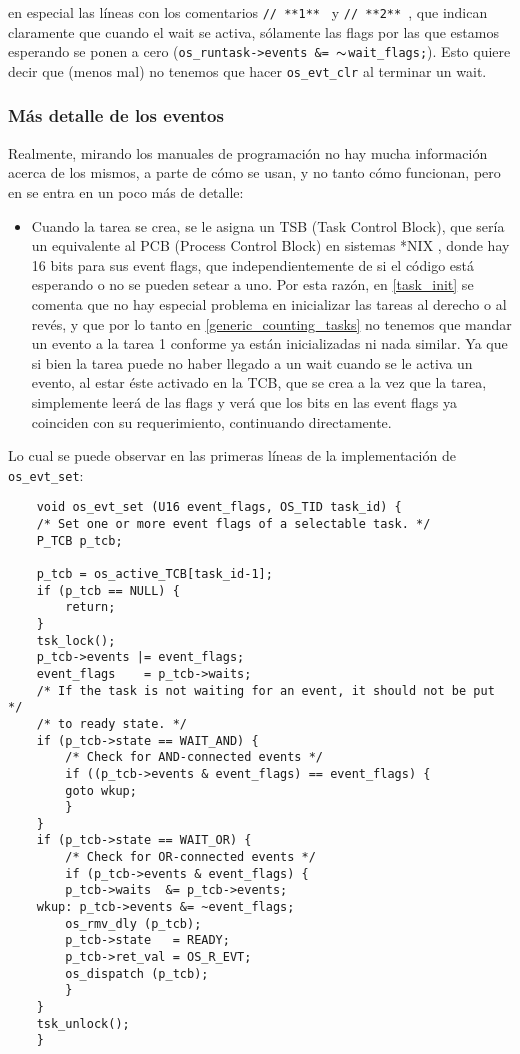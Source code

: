 \documentclass[a4paper,openright,12pt]{article}
\begin{document}
en especial las líneas con los comentarios \texttt{// **1**  } y \texttt{// **2**  }, que indican claramente
que cuando el wait se activa, sólamente las flags por las que estamos esperando se ponen a cero (\texttt{os\_runtask->events \&= $\thicksim$wait\_flags;}).
Esto quiere decir que (menos mal) no tenemos que hacer \texttt{os\_evt\_clr} al terminar un wait.

\subsubsection{Más detalle de los eventos}
Realmente, mirando los manuales de programación no hay mucha información acerca de los mismos, a parte de cómo se usan, y no tanto cómo funcionan, pero en \autocite[28]{rl_arm_gs}
se entra en un poco más de detalle:
\begin{itemize}
    \item Cuando la tarea se crea, se le asigna un TSB (Task Control Block), que sería un equivalente al PCB (Process Control Block) en sistemas *NIX
          \parencite{process_control_block_pcb_wikipedia}, donde hay 16 bits para sus event flags, que independientemente de si el código está esperando o no se pueden setear a uno.
          Por esta razón, en \ref{task_init} se comenta que no hay especial problema en inicializar las tareas al derecho o al revés, y que por lo tanto en \ref{generic_counting_tasks}
          no tenemos que mandar un evento a la tarea 1 conforme ya están inicializadas ni nada similar.
          Ya que si bien la tarea puede no haber llegado a un wait cuando se le activa un evento, al estar éste activado en la TCB, que se
          crea a la vez que la tarea, simplemente leerá de las flags y verá que los bits en las event flags ya coinciden con su requerimiento, continuando directamente.
\end{itemize}
Lo cual se puede observar en las primeras líneas de la implementación de \texttt{os\_evt\_set}:
\begin{verbatim}
    void os_evt_set (U16 event_flags, OS_TID task_id) {
    /* Set one or more event flags of a selectable task. */
    P_TCB p_tcb;

    p_tcb = os_active_TCB[task_id-1];
    if (p_tcb == NULL) {
        return;
    }
    tsk_lock();
    p_tcb->events |= event_flags;
    event_flags    = p_tcb->waits;
    /* If the task is not waiting for an event, it should not be put */
    /* to ready state. */
    if (p_tcb->state == WAIT_AND) {
        /* Check for AND-connected events */
        if ((p_tcb->events & event_flags) == event_flags) {
        goto wkup;
        }
    }
    if (p_tcb->state == WAIT_OR) {
        /* Check for OR-connected events */
        if (p_tcb->events & event_flags) {
        p_tcb->waits  &= p_tcb->events;
    wkup: p_tcb->events &= ~event_flags;
        os_rmv_dly (p_tcb);
        p_tcb->state   = READY;
        p_tcb->ret_val = OS_R_EVT;
        os_dispatch (p_tcb);
        }
    }
    tsk_unlock();
    }
\end{verbatim}
\end{document}
